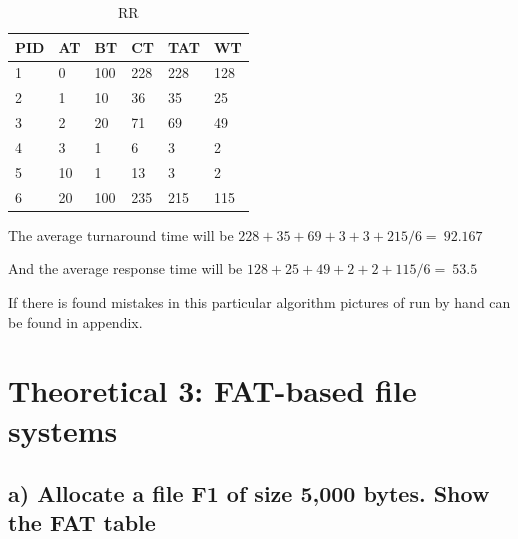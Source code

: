 \documentclass[11pt,a4paper]{article}
\theoremstyle{plain}
\theoremstyle{definition}
\theoremstyle{remark}
\numberwithin{equation}{section}
\begin{document}
\begin{table}[H]
    \centering
    \caption{RR}
    \label{t2-rr}
    \begin{tabular}{llllll}
        \hline
        \multicolumn{1}{|l|}{PID} & \multicolumn{1}{l|}{AT} & \multicolumn{1}{l|}{BT} & \multicolumn{1}{l|}{CT} & \multicolumn{1}{l|}{TAT} & \multicolumn{1}{l|}{WT} \\ \hline
        1                         & 0                       & 100                     & 228                     & 228                      & 128                     \\
        2                         & 1                       & 10                      & 36                      & 35                       & 25                      \\
        3                         & 2                       & 20                      & 71                      & 69                       & 49                      \\
        4                         & 3                       & 1                       & 6                       & 3                        & 2                       \\
        5                         & 10                      & 1                       & 13                      & 3                        & 2                       \\
        6                         & 20                      & 100                     & 235                     & 215                      & 115                    
    \end{tabular}
\end{table}



The average turnaround time will be $228+35+69+3+3+215/6=~92.167$

And the average response time will be $128+25+49+2+2+115/6=~53.5$

If there is found mistakes in this particular algorithm pictures of run by hand can be found in appendix.

\section*{Theoretical 3: FAT-based file systems}

\subsection*{a) Allocate a file F1 of size 5,000 bytes. Show the FAT table}
\end{document}
